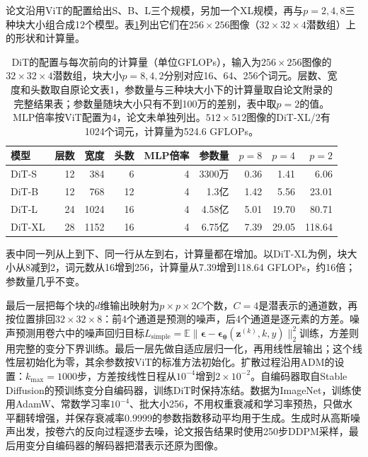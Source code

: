 论文沿用ViT的配置给出S、B、L三个规模，另加一个XL规模，再与$p=2,4,8$三种块大小组合成12个模型。表\ref{tab:vision-ivm-dit-configs}列出它们在$256\times256$图像（$32\times32\times4$潜数组）上的形状和计算量。

\begin{table}[tbp]
  \centering
  \small
  \begin{tabular}{@{}lrrrrrrrr@{}}
    \toprule
    模型 & 层数 & 宽度 & 头数 & MLP倍率 & 参数量 & $p=8$ & $p=4$ & $p=2$\\
    \midrule
    DiT-S & 12 & 384 & 6 & 4 & 3300万 & 0.36 & 1.41 & 6.06\\
    DiT-B & 12 & 768 & 12 & 4 & 1.3亿 & 1.42 & 5.56 & 23.01\\
    DiT-L & 24 & 1024 & 16 & 4 & 4.58亿 & 5.01 & 19.70 & 80.71\\
    DiT-XL & 28 & 1152 & 16 & 4 & 6.75亿 & 7.39 & 29.05 & 118.64\\
    \bottomrule
  \end{tabular}
  \caption{DiT的配置与每次前向的计算量（单位GFLOPs），输入为$256\times256$图像的$32\times32\times4$潜数组，块大小$p=8,4,2$分别对应16、64、256个词元。层数、宽度和头数取自原论文表1，参数量与三种块大小下的计算量取自论文附录的完整结果表；参数量随块大小只有不到100万的差别，表中取$p=2$的值。MLP倍率按ViT配置为4，论文未单独列出。$512\times512$图像的DiT-XL/2有1024个词元，计算量为524.6 GFLOPs。}
  \label{tab:vision-ivm-dit-configs}
\end{table}

表中同一列从上到下、同一行从左到右，计算量都在增加。以DiT-XL为例，块大小从8减到2，词元数从16增到256，计算量从7.39增到118.64 GFLOPs，约16倍；参数量几乎不变。

最后一层把每个块的$d$维输出映射为$p\times p\times2C$个数，$C=4$是潜表示的通道数，再按位置排回$32\times32\times8$：前4个通道是预测的噪声，后4个通道是逐元素的方差。噪声预测用卷六中的噪声回归目标$L_{\mathrm{simple}}=\mathbb E\lVert\bm\epsilon-\bm\epsilon_{\bm\theta}(\bm z^{(k)},k,y)\rVert_2^2$训练，方差则用完整的变分下界训练。最后一层先做自适应层归一化，再用线性层输出；这个线性层初始化为零，其余参数按ViT的标准方法初始化。扩散过程沿用ADM的设置：$k_{\max}=1000$步，方差按线性日程从$10^{-4}$增到$2\times10^{-2}$。自编码器取自Stable Diffusion的预训练变分自编码器，训练DiT时保持冻结。数据为ImageNet，训练使用AdamW、常数学习率$10^{-4}$、批大小256，不用权重衰减和学习率预热，只做水平翻转增强，并保存衰减率0.9999的参数指数移动平均用于生成。生成时从高斯噪声出发，按卷六的反向过程逐步去噪，论文报告结果时使用250步DDPM采样，最后用变分自编码器的解码器把潜表示还原为图像。


